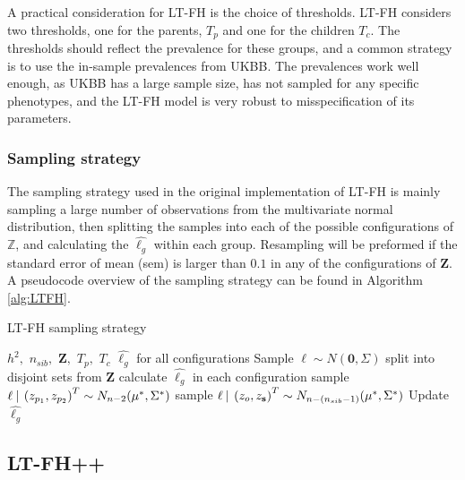 A practical consideration for LT-FH is the choice of thresholds. LT-FH considers two thresholds, one for the parents, $ T_p $ and one for the children $ T_c $. The thresholds should reflect the prevalence for these groups, and a common strategy is to use the in-sample prevalences from UKBB. The prevalences work well enough, as UKBB has a large sample size, has not sampled for any specific phenotypes, and the LT-FH model is very robust to misspecification of its parameters.

\subsubsection{Sampling strategy}

The sampling strategy used in the original implementation of LT-FH is mainly sampling a large number of observations from the multivariate normal distribution, then splitting the samples into each of the possible configurations of $ \mathbb{Z} $, and calculating the $ \hat{\ell_g} $ within each group. Resampling will be preformed if the standard error of mean (sem) is larger than $ 0.1 $ in any of the configurations of $ \mathbf{Z} $. A pseudocode overview of the sampling strategy can be found in Algorithm \ref{alg:LTFH}.


\begin{algorithm}[h] \label{alg:LTFH}
	\caption{LT-FH sampling strategy}
\begin{algorithmic}[1]
\INPUT $ h^2,$  $n_{sib},$  $\mathbf{Z},$  $T_p,$  $T_c$ 
\OUTPUT $ \hat{\ell_g} $ for all configurations
\STATE Sample $ \ell \sim N(\mathbf{0}, \Sigma) $ 
\STATE split into disjoint sets from $ \mathbf{Z} $
\STATE calculate $ \hat{\ell_g} $ in each configuration 
		\STATE sample  $ \ell \:\vert\: \left(z_{p_1}, z_{p_2} \right)^T \sim N_{n-2}(\mu^*, \Sigma^*) $
		\STATE sample $ \ell \:\vert\: \left(z_{o}, z_{\mathbf{s}} \right)^T \sim N_{n-(n_{sib} - 1)}(\mu^*, \Sigma^*) $
	\ENDIF	
	\STATE Update $ \hat{\ell_g} $
\ENDWHILE
\end{algorithmic}
\end{algorithm}

\subsection{LT-FH++}

